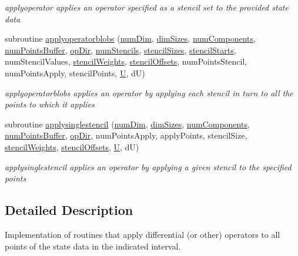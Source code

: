 \begin{DoxyCompactItemize}
\begin{DoxyCompactList}\small\item\em applyoperator applies an operator specified as a stencil set to the provided state data \end{DoxyCompactList}\item 
subroutine \hyperlink{namespaceoperators_a526cfaf4061ff38e8b9cba873cb1392c}{applyoperatorblobs} (\hyperlink{SATKernels_8H_a680185db8546de161968dabace9e94f1}{num\+Dim}, \hyperlink{SATKernels_8H_a338d2e6b5802f9ba652d355df0b1a04b}{dim\+Sizes}, \hyperlink{SimpleKernels_8H_abb39988074870d597c8d1cfcf61514ee}{num\+Components}, \hyperlink{WENOKernels_8H_a86c25ff33e6d9bccfabdf45dc5ddf24c}{num\+Points\+Buffer}, \hyperlink{OperatorKernels_8H_afc6f027cdb36bf6d86e573c2083e555b}{op\+Dir}, \hyperlink{OperatorKernels_8H_a3ebb77d78da88e132f012ab6788ff123}{num\+Stencils}, \hyperlink{OperatorKernels_8H_ad36f7e6638c24dc8cce030ebb48e32a4}{stencil\+Sizes}, \hyperlink{OperatorKernels_8H_ab81c9b92fc99d6a20e08f1ad1c9630b0}{stencil\+Starts}, num\+Stencil\+Values, \hyperlink{OperatorKernels_8H_a71782584f6f521c3d69ed8a53fbbbd59}{stencil\+Weights}, \hyperlink{OperatorKernels_8H_aace4e878476c6638c99ce2be58848e52}{stencil\+Offsets}, num\+Points\+Stencil, num\+Points\+Apply, stencil\+Points, \hyperlink{SimpleKernels_8H_aca4ab6143606c908fb1a7de286ddddae}{U}, dU)
\begin{DoxyCompactList}\small\item\em applyoperatorblobs applies an operator by applying each stencil in turn to all the points to which it applies \end{DoxyCompactList}\item 
subroutine \hyperlink{namespaceoperators_ac15b9cb3b0cb47f9a68c536b4f096941}{applysinglestencil} (\hyperlink{SATKernels_8H_a680185db8546de161968dabace9e94f1}{num\+Dim}, \hyperlink{SATKernels_8H_a338d2e6b5802f9ba652d355df0b1a04b}{dim\+Sizes}, \hyperlink{SimpleKernels_8H_abb39988074870d597c8d1cfcf61514ee}{num\+Components}, \hyperlink{WENOKernels_8H_a86c25ff33e6d9bccfabdf45dc5ddf24c}{num\+Points\+Buffer}, \hyperlink{OperatorKernels_8H_afc6f027cdb36bf6d86e573c2083e555b}{op\+Dir}, num\+Points\+Apply, apply\+Points, stencil\+Size, \hyperlink{OperatorKernels_8H_a71782584f6f521c3d69ed8a53fbbbd59}{stencil\+Weights}, \hyperlink{OperatorKernels_8H_aace4e878476c6638c99ce2be58848e52}{stencil\+Offsets}, \hyperlink{SimpleKernels_8H_aca4ab6143606c908fb1a7de286ddddae}{U}, dU)
\begin{DoxyCompactList}\small\item\em applysinglestencil applies an operator by applying a given stencil to the specified points \end{DoxyCompactList}\end{DoxyCompactItemize}


\subsection{Detailed Description}
Implementation of routines that apply differential (or other) operators to all points of the state data in the indicated interval. 

